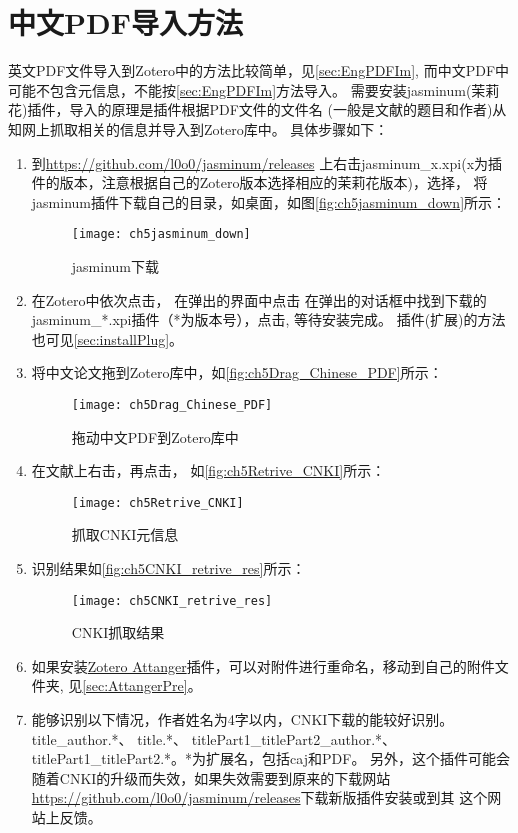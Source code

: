 \documentclass[theorem=false,mathfont=none,openany,sub3section]{easybook}
\begin{document}
{\section{中文PDF导入方法}\label{sec:Chinese_PDF}
英文PDF文件导入到Zotero中的方法比较简单，见\cref{sec:EngPDFIm},
而中文PDF中可能不包含元信息，不能按\cref{sec:EngPDFIm}方法导入。
需要安装jasminum(茉莉花)插件，导入的原理是插件根据PDF文件的文件名
(一般是文献的题目和作者)从知网上抓取相关的信息并导入到Zotero库中。
具体步骤如下：
\begin{enumerate}
	\item 到\url{https://github.com/l0o0/jasminum/releases}
	上右击jasminum\_x.xpi(x为插件的版本，注意根据自己的Zotero版本选择相应的茉莉花版本)，选择，
	将jasminum插件下载自己的目录，如桌面，如图\autoref{fig:ch5jasminum_down}所示：
	\begin{figure}[ht]
		\centering
		\texttt{[image: ch5jasminum\_down]}
		\caption{jasminum下载}
		\label{fig:ch5jasminum_down}
	\end{figure}
	\item 在Zotero中依次点击，
	在弹出的界面中点击
	在弹出的对话框中找到下载的jasminum\_*.xpi插件（*为版本号），点击,
	等待安装完成。
	插件(扩展)的方法也可见\cref{sec:installPlug}。
	\item 将中文论文拖到Zotero库中，如\autoref{fig:ch5Drag_Chinese_PDF}所示：
	\begin{figure}[ht]
		\centering
		\texttt{[image: ch5Drag\_Chinese\_PDF]}
		\caption{拖动中文PDF到Zotero库中}
		\label{fig:ch5Drag_Chinese_PDF}
	\end{figure}
	\item 在文献上右击，再点击，
	如\autoref{fig:ch5Retrive_CNKI}所示：
	\begin{figure}[ht]
		\centering
		\texttt{[image: ch5Retrive\_CNKI]}
		\caption{抓取CNKI元信息}
		\label{fig:ch5Retrive_CNKI}
	\end{figure}
	\item 识别结果如\autoref{fig:ch5CNKI_retrive_res}所示：
	\begin{figure}[ht]
		\centering
		\texttt{[image: ch5CNKI\_retrive\_res]}
		\caption{CNKI抓取结果}
		\label{fig:ch5CNKI_retrive_res}
	\end{figure}
	\item 如果安装\href{https://github.com/MuiseDestiny/zotero-attanger}{Zotero Attanger}插件，可以对附件进行重命名，移动到自己的附件文件夹,
	见\cref{sec:AttangerPre}。
	\item 能够识别以下情况，作者姓名为4字以内，CNKI下载的能较好识别。
	title\_author.*、
	title.*、
	titlePart1\_titlePart2\_author.*、
	titlePart1\_titlePart2.*。*为扩展名，包括caj和PDF。
	另外，这个插件可能会随着CNKI的升级而失效，如果失效需要到原来的下载网站
	\url{https://github.com/l0o0/jasminum/releases}下载新版插件安装或到其
	这个网站上反馈。
	

\end{enumerate}}
\end{document}
